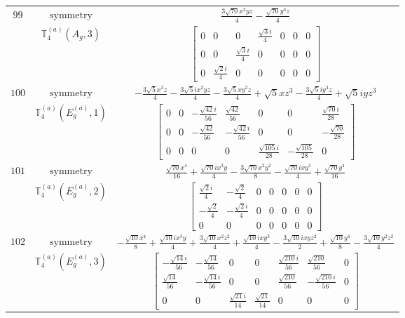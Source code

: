 \documentclass[fleqn,8pt,landscape]{jsarticle}
\begin{document}
\begin{longtable}{ccc}
$ 99 $ & $ \text{symmetry} $ & $ \frac{3 \sqrt{70} x^{2} y z}{4} - \frac{\sqrt{70} y^{3} z}{4} $ \\
$  $ & $ \mathbb{T}_{4}^{(a)}(A_{g},3) $ & $ \begin{bmatrix} 0 & 0 & 0 & \frac{\sqrt{3} i}{4} & 0 & 0 & 0 \\ 0 & 0 & \frac{\sqrt{3} i}{4} & 0 & 0 & 0 & 0 \\ 0 & \frac{\sqrt{2} i}{4} & 0 & 0 & 0 & 0 & 0 \end{bmatrix} $ \\ \hline
$ 100 $ & $ \text{symmetry} $ & $ - \frac{3 \sqrt{5} x^{3} z}{4} - \frac{3 \sqrt{5} i x^{2} y z}{4} - \frac{3 \sqrt{5} x y^{2} z}{4} + \sqrt{5} x z^{3} - \frac{3 \sqrt{5} i y^{3} z}{4} + \sqrt{5} i y z^{3} $ \\
$  $ & $ \mathbb{T}_{4}^{(a)}(E_{g}^{(a)},1) $ & $ \begin{bmatrix} 0 & 0 & - \frac{\sqrt{42} i}{56} & \frac{\sqrt{42}}{56} & 0 & 0 & \frac{\sqrt{70} i}{28} \\ 0 & 0 & - \frac{\sqrt{42}}{56} & - \frac{\sqrt{42} i}{56} & 0 & 0 & - \frac{\sqrt{70}}{28} \\ 0 & 0 & 0 & 0 & \frac{\sqrt{105} i}{28} & - \frac{\sqrt{105}}{28} & 0 \end{bmatrix} $ \\ \hline
$ 101 $ & $ \text{symmetry} $ & $ \frac{\sqrt{70} x^{4}}{16} + \frac{\sqrt{70} i x^{3} y}{4} - \frac{3 \sqrt{70} x^{2} y^{2}}{8} - \frac{\sqrt{70} i x y^{3}}{4} + \frac{\sqrt{70} y^{4}}{16} $ \\
$  $ & $ \mathbb{T}_{4}^{(a)}(E_{g}^{(a)},2) $ & $ \begin{bmatrix} \frac{\sqrt{2} i}{4} & - \frac{\sqrt{2}}{4} & 0 & 0 & 0 & 0 & 0 \\ - \frac{\sqrt{2}}{4} & - \frac{\sqrt{2} i}{4} & 0 & 0 & 0 & 0 & 0 \\ 0 & 0 & 0 & 0 & 0 & 0 & 0 \end{bmatrix} $ \\ \hline
$ 102 $ & $ \text{symmetry} $ & $ - \frac{\sqrt{10} x^{4}}{8} + \frac{\sqrt{10} i x^{3} y}{4} + \frac{3 \sqrt{10} x^{2} z^{2}}{4} + \frac{\sqrt{10} i x y^{3}}{4} - \frac{3 \sqrt{10} i x y z^{2}}{2} + \frac{\sqrt{10} y^{4}}{8} - \frac{3 \sqrt{10} y^{2} z^{2}}{4} $ \\
$  $ & $ \mathbb{T}_{4}^{(a)}(E_{g}^{(a)},3) $ & $ \begin{bmatrix} - \frac{\sqrt{14} i}{56} & - \frac{\sqrt{14}}{56} & 0 & 0 & \frac{\sqrt{210} i}{56} & \frac{\sqrt{210}}{56} & 0 \\ \frac{\sqrt{14}}{56} & - \frac{\sqrt{14} i}{56} & 0 & 0 & \frac{\sqrt{210}}{56} & - \frac{\sqrt{210} i}{56} & 0 \\ 0 & 0 & \frac{\sqrt{21} i}{14} & \frac{\sqrt{21}}{14} & 0 & 0 & 0 \end{bmatrix} $ \\ \hline

\end{longtable}
\end{document}
